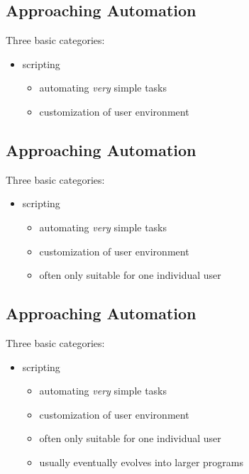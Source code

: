 \documentclass[xga]{xdvislides}
\begin{document}
\subsection{Approaching Automation}
Three basic categories:
\\

\begin{itemize}
	\item scripting
		\begin{itemize}
			\item automating {\em very} simple tasks
			\item customization of user environment
		\end{itemize}
\end{itemize}

\subsection{Approaching Automation}
Three basic categories:
\\

\begin{itemize}
	\item scripting
		\begin{itemize}
			\item automating {\em very} simple tasks
			\item customization of user environment
			\item often only suitable for one individual user
		\end{itemize}
\end{itemize}

\subsection{Approaching Automation}
Three basic categories:
\\

\begin{itemize}
	\item scripting
		\begin{itemize}
			\item automating {\em very} simple tasks
			\item customization of user environment
			\item often only suitable for one individual user
			\item usually eventually evolves into larger programs
		\end{itemize}
\end{itemize}
\end{document}
